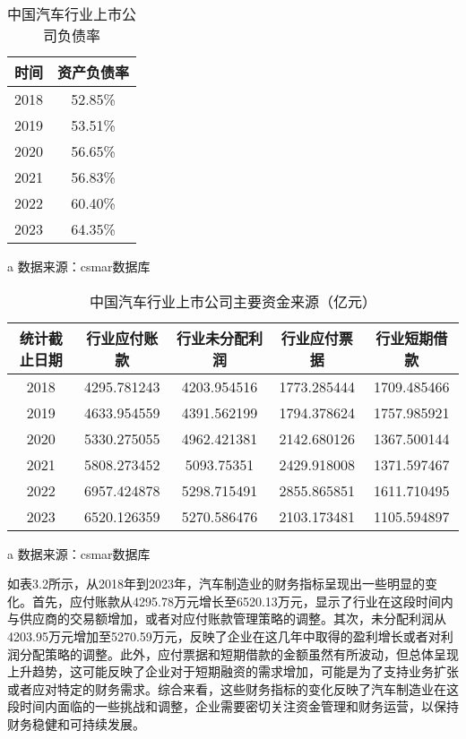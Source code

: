 \begin{table}
  \centering
  \begin{threeparttable}[c]
    \caption{中国汽车行业上市公司负债率}
    \label{tab:rates}
    \begin{tabular}{cc}
      \toprule
      时间    & 资产负债率   \\
      \midrule
        2018 & 52.85\% \\ 
        2019 & 53.51\% \\ 
        2020 & 56.65\% \\ 
        2021 & 56.83\% \\ 
        2022 & 60.40\% \\ 
        2023 & 64.35\% \\ 
      \bottomrule
    \end{tabular}
    \begin{tablenotes}
      \item [a] 数据来源：csmar数据库
    \end{tablenotes}
  \end{threeparttable}
\end{table}
\begin{table}
  \centering
  \begin{threeparttable}[c]
    \caption{中国汽车行业上市公司主要资金来源（亿元）}
    \label{tab:cash-sources}
    \begin{tabular}{ccccc}
      \toprule
        统计截止日期 & 行业应付账款 & 行业未分配利润 & 行业应付票据 & 行业短期借款 \\ 
      \midrule
        2018 & 4295.781243 & 4203.954516 & 1773.285444 & 1709.485466 \\ 
        2019 & 4633.954559 & 4391.562199 & 1794.378624 & 1757.985921 \\ 
        2020 & 5330.275055 & 4962.421381 & 2142.680126 & 1367.500144 \\ 
        2021 & 5808.273452 & 5093.75351 & 2429.918008 & 1371.597467 \\ 
        2022 & 6957.424878 & 5298.715491 & 2855.865851 & 1611.710495 \\ 
        2023 & 6520.126359 & 5270.586476 & 2103.173481 & 1105.594897 \\ 
      \bottomrule
    \end{tabular}
    \begin{tablenotes}
      \item [a] 数据来源：csmar数据库
    \end{tablenotes}
  \end{threeparttable}
\end{table}
如表3.2所示，从2018年到2023年，汽车制造业的财务指标呈现出一些明显的变化。首先，应付账款从4295.78万元增长至6520.13万元，显示了行业在这段时间内与供应商的交易额增加，或者对应付账款管理策略的调整。其次，未分配利润从4203.95万元增加至5270.59万元，反映了企业在这几年中取得的盈利增长或者对利润分配策略的调整。此外，应付票据和短期借款的金额虽然有所波动，但总体呈现上升趋势，这可能反映了企业对于短期融资的需求增加，可能是为了支持业务扩张或者应对特定的财务需求。综合来看，这些财务指标的变化反映了汽车制造业在这段时间内面临的一些挑战和调整，企业需要密切关注资金管理和财务运营，以保持财务稳健和可持续发展。

